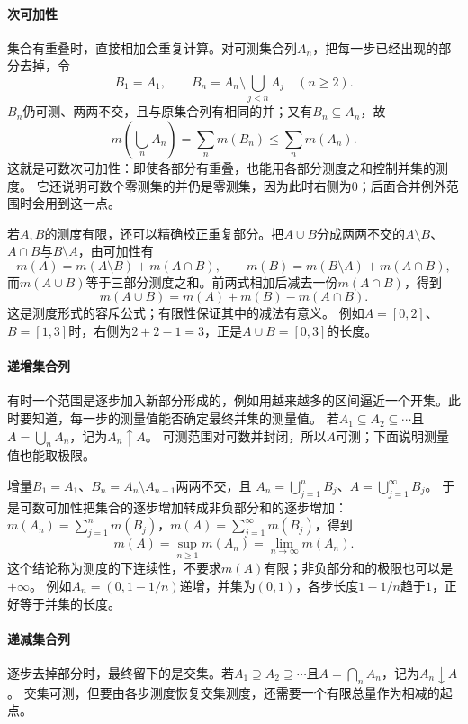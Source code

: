 \paragraph{次可加性}

集合有重叠时，直接相加会重复计算。对可测集合列$A_n$，把每一步已经出现的部分去掉，令
\[
 B_1=A_1,\qquad B_n=A_n\setminus\bigcup_{j<n}A_j\quad(n\geq2).
\]
$B_n$仍可测、两两不交，且与原集合列有相同的并；又有$B_n\subseteq A_n$，故
\[
 m\left(\bigcup_nA_n\right)=\sum_nm(B_n)\leq\sum_nm(A_n).
\]
这就是可数次可加性：即使各部分有重叠，也能用各部分测度之和控制并集的测度。
它还说明可数个零测集的并仍是零测集，因为此时右侧为$0$；后面合并例外范围时会用到这一点。

若$A,B$的测度有限，还可以精确校正重复部分。把$A\cup B$分成两两不交的$A\setminus B$、$A\cap B$与$B\setminus A$，由可加性有
\[
 m(A)=m(A\setminus B)+m(A\cap B),\qquad m(B)=m(B\setminus A)+m(A\cap B),
\]
而$m(A\cup B)$等于三部分测度之和。前两式相加后减去一份$m(A\cap B)$，得到
\[
 m(A\cup B)=m(A)+m(B)-m(A\cap B).
\]
这是测度形式的容斥公式；有限性保证其中的减法有意义。
例如$A=[0,2]$、$B=[1,3]$时，右侧为$2+2-1=3$，正是$A\cup B=[0,3]$的长度。

\paragraph{递增集合列}

有时一个范围是逐步加入新部分形成的，例如用越来越多的区间逼近一个开集。此时要知道，每一步的测量值能否确定最终并集的测量值。
若$A_1\subseteq A_2\subseteq\cdots$且$A=\bigcup_nA_n$，记为$A_n\uparrow A$。
可测范围对可数并封闭，所以$A$可测；下面说明测量值也能取极限。

增量$B_1=A_1$、$B_n=A_n\setminus A_{n-1}$两两不交，且
$A_n=\bigcup_{j=1}^nB_j$、$A=\bigcup_{j=1}^{\infty}B_j$。
于是可数可加性把集合的逐步增加转成非负部分和的逐步增加：$m(A_n)=\sum_{j=1}^nm(B_j)$，$m(A)=\sum_{j=1}^{\infty}m(B_j)$，得到
\begin{equation}
 m(A)=\sup_{n\geq1}m(A_n)=\lim_{n\to\infty}m(A_n).
 \label{eq:comb-measure-continuity-below}
\end{equation}
这个结论称为测度的下连续性，不要求$m(A)$有限；非负部分和的极限也可以是$+\infty$。
例如$A_n=(0,1-1/n)$递增，并集为$(0,1)$，各步长度$1-1/n$趋于$1$，正好等于并集的长度。

\paragraph{递减集合列}

逐步去掉部分时，最终留下的是交集。若$A_1\supseteq A_2\supseteq\cdots$且$A=\bigcap_nA_n$，记为$A_n\downarrow A$。
交集可测，但要由各步测度恢复交集测度，还需要一个有限总量作为相减的起点。

